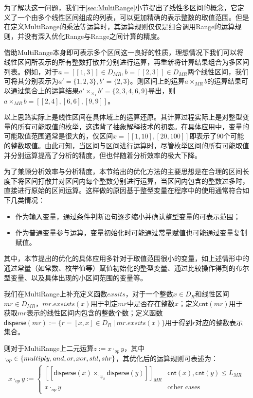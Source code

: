 为了解决这一问题，我们于\ref{sec:MultiRange}小节提出了线性多区间的概念，它定义了一个由多个线性区间组成的列表，可以更加精确的表示整数的取值范围。但是在定义MultiRange的乘法等运算时，其运算规则仅仅是组合调用Range的运算规则，并没有深入优化Range与Range之间计算的精度。

借助MultiRange本身即可表示多个区间这一良好的性质，理想情况下我们可以将线性区间所表示的所有整数打散并分别进行运算，再重新将计算结果组合为多区间列表。例如，对于$ a = [[1, 3]] \in D_{MR} , b = [[2, 3]] \in D_{MR}$两个线性区间，我们可将其分别表示为$ a' = \{1, 2, 3\}, b' = \{2, 3\} $。则区间上的运算$ a \times_{MR} b $的运算结果可以通过集合上的运算结果$ a' \times_{\times_I} b' = \{2, 3, 4, 6, 9\} $导出，则$ a \times_{MR} b = [[2, 4], [6, 6], [9, 9]] $。

以上思路实际上是线性区间在具体域上的运算还原。其计算过程实际上是对整型变量的所有可能取值的枚举，这违背了抽象解释技术的初衷。在具体应用中，变量的可能取值范围通常是很大的，仅区间$ x = [[1, 10], [20, 100]] $即表示了90个可能的整数取值。由此可知，当区间与区间进行运算时，尽管枚举区间的所有可能取值并分别运算提高了分析的精度，但也伴随着分析效率的极大下降。

为了兼顾分析效率与分析精度，本节给出的优化方法的主要思想是在合理的区间长度下将区间打散并对区间内每个整数分别进行运算，当区间内包含的整数过多时，直接进行原始的区间运算。这样做的原因基于整型变量在程序中的使用通常符合如下几类情况：
\begin{itemize}
	\item 作为输入变量，通过条件判断语句逐步缩小并确认整型变量的可表示范围；
	\item 作为普通变量参与运算，变量初始化时可能通过常量赋值也可能通过变量复制赋值。
\end{itemize}

其中，本节提出的优化的具体应用多针对于取值范围很小的变量，如上述情形中的通过常量（如常数、枚举值等）赋值初始化的整型变量、通过比较操作得到的布尔型变量、以及具体出现的小区间范围的变量等。

我们在MultiRange上补充定义函数$ exsits $，对于一个整数$ x \in D_R $和线性区间$ mr \in D_{MR} $，$ mr.exsists(x) $用于判定$ mr $中是否存在整数$ x $；定义$ \mathsf{cnt}(mr) $用于获取$ mr $表示的线性区间内包含的整数个数；定义函数$ \mathsf{disperse}(mr) := \{r = [x, x] \in D_R ~|~ mr.exsits(x) \}$用于得到$ r $对应的整数表示集合。

则对于MultiRange上二元运算$ z := x \cdot_{op} y$，其中$ \cdot_{op} \in \{ multiply, and, or, xor, \\shl, shr \} $，其优化后的运算规则可表述为：
\begin{align}
	x \cdot_{op} y := \begin{cases}
		[[\mathsf{disperse}(x) \times_{\cdot_{op_R}} \mathsf{disperse}(y)]]_{MR} & 
			\mathsf{cnt}(x), \mathsf{cnt}(y) \le L_{MR}\\
		x \cdot_{op} y & \text{other cases}
	\end{cases}
\end{align}

